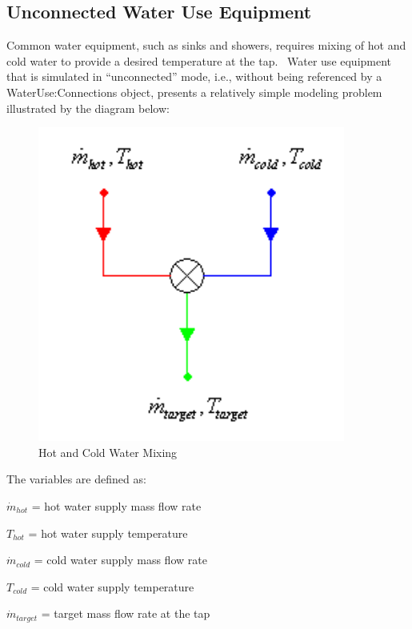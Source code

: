 \subsection{Unconnected Water Use Equipment}\label{unconnected-water-use-equipment}

Common water equipment, such as sinks and showers, requires mixing of hot and cold water to provide a desired temperature at the tap.~ Water use equipment that is simulated in ``unconnected'' mode, i.e., without being referenced by a WaterUse:Connections object, presents a relatively simple modeling problem illustrated by the diagram below:

\begin{figure}[hbtp] %
\centering
\includegraphics[width=0.9\textwidth, height=0.9\textheight, keepaspectratio=true]{media/image6937.png}
\caption{Hot and Cold Water Mixing \protect \label{fig:hot-and-cold-water-mixing}}
\end{figure}

The variables are defined as:

\({\dot m_{hot}}\) = hot water supply mass flow rate

\({T_{hot}}\) = hot water supply temperature

\({\dot m_{cold}}\) = cold water supply mass flow rate

\({T_{cold}}\) = cold water supply temperature

\({\dot m_{target}}\) = target mass flow rate at the tap

